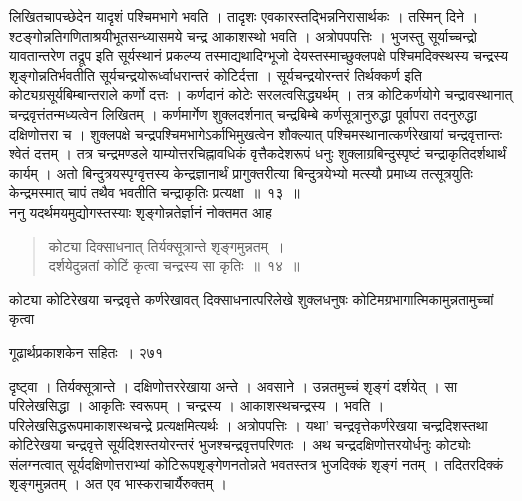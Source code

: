 \documentclass[11pt, openany]{book}
\begin{document}
\noindent लिखितचापच्छेदेन यादृशं पश्चिमभागे भवति । तादृशः एवकारस्तद्भिन्ननिरासार्थकः । तस्मिन् दिने । श्टङ्गोन्नतिगणिताश्रयीभूतसन्ध्यासमये चन्द्र आकाशस्थो भवति । अत्रोपपपत्तिः । भुजस्तु सूर्याच्चन्द्रो यावतान्तरेण तद्रूप इति सूर्यस्थानं प्रकल्प्य तस्माद्यथादिग्भूजो देयस्तस्माच्छुक्लपक्षे पश्चिमदिक्स्थस्य चन्द्रस्य शृङ्गोन्नतिर्भवतीति सूर्यचन्द्रयोरूर्ध्वाधरान्तरं कोटिर्दत्ता । सूर्यचन्द्रयोरन्तरं तिर्थक्कर्ण इति कोट्यग्रसूर्यबिम्बान्तराले कर्णो दत्तः । कर्णदानं कोटेः सरलत्वसिद्ध्यर्थम् । तत्र कोटिकर्णयोगे चन्द्रावस्थानात् चन्द्रवृत्तंतन्मध्यत्वेन लिखितम् । कर्णमार्गेण शुक्लदर्शनात् चन्द्रबिम्बे कर्णसूत्रानुरुद्धा पूर्वापरा तदनुरुद्धा दक्षिणोत्तरा च । शुक्लपक्षे चन्द्रपश्चिमभागेऽर्काभिमुखत्वेन शौक्ल्यात् पश्चिमस्थानात्कर्णरेखायां चन्द्रवृत्तान्तः श्वेतं दत्तम् । तत्र चन्द्रमण्डले याम्योत्तरचिह्नावधिकं वृत्तैकदेशरूपं धनुः शुक्लाग्रबिन्दुस्पृष्टं चन्द्राकृतिदर्शथार्थं कार्यम् । अतो बिन्दुत्रयस्पृग्वृत्तस्य केन्द्रज्ञानार्थं प्रागुक्तरीत्या बिन्दुत्रयेभ्यो मत्स्यौ प्रमाध्य तत्सूत्रयुतिः केन्द्रमस्मात् चापं तथैव भवतीति चन्द्राकृतिः प्रत्यक्षा~॥~१३~॥ \\
\noindent ननु यदर्थमयमुद्योगस्तस्याः शृङ्गोन्नतेर्ज्ञानं नोक्तमत आह \textendash
\begin{quote}
{\ssi कोट्या दिक्साधनात् तिर्यक्सूत्रान्ते शृङ्गमुन्नतम्~। \\
दर्शयेदुन्नतां कोटिं कृत्वा चन्द्रस्य सा कृतिः~॥~१४~॥ }
\end{quote}
 कोट्या कोटिरेखया चन्द्रवृत्ते कर्णरेखावत् दिक्साधनात्परिलेखे शुक्लधनुषः कोटिमग्रभागात्मिकामुन्नतामुच्चां कृत्वा


\newpage

\hspace{3cm} गूढार्थप्रकाशकेन सहितः~। \hfill २७१
\vspace{1cm}


\noindent दृष्ट्वा । तिर्यक्सूत्रान्ते । दक्षिणोत्तररेखाया अन्ते । अवसाने । उन्नतमुच्चं शृङ्गं दर्शयेत् । सा परिलेखसिद्धा । आकृतिः स्वरूपम् । चन्द्रस्य । आकाशस्थचन्द्रस्य । भवति । परिलेखसिद्धरूपमाकाशस्थचन्द्रे प्रत्यक्षमित्यर्थः । अत्रोपपत्तिः । यथा' चन्द्रवृत्तेकर्णरेखया चन्द्रदिशस्तथा कोटिरेखया चन्द्रवृत्ते सूर्यदिशस्तयोरन्तरं भुजश्चन्द्रवृत्तपरिणतः । अथ चन्द्रदक्षिणोत्तरयोर्धनुः कोट्योः संलग्नत्वात् सूर्यदक्षिणोत्तराभ्यां कोटिरूपशृङ्गेणनतोन्नते भवतस्तत्र भुजदिक्कं शृङ्गं नतम् । तदितरदिक्कं शृङ्गमुन्नतम् । अत एव भास्कराचार्यैरुक्तम् ।
\end{document}
